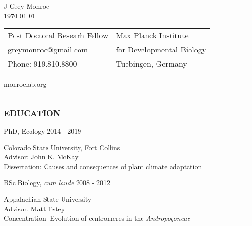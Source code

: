 \documentclass[12pt,english]{article}
\providecommand{\tabularnewline}{\\}
\begin{document}
\begin {center}
{\huge J Grey Monroe}\tabularnewline
\vspace{1em}
\today

\vspace{1em}

\begin{tabular}{>{\raggedright}p{3in}>{\raggedleft}p{3in}}
Post Doctoral Researh Fellow & Max Planck Institute\tabularnewline
 greymonroe@gmail.com &  for Developmental Biology \tabularnewline
Phone: 919.810.8800 & Tuebingen, Germany\tabularnewline
\end{tabular}
\href{https://monroelab.org}{monroelab.org}
\end{center}
\vspace{-1em}

\rule[0.5ex]{1\columnwidth}{0.5pt}


\subsubsection*{EDUCATION}
\vspace{-0.5ex}

\hspace{1.0em} PhD, Ecology
\hfill
2014 - 2019
\par
\hspace*{2.0em} Colorado State University, Fort Collins \\
\hspace*{2.0em} Advisor: John K. McKay \\
\hspace*{2.0em} Dissertation: Causes and consequences of plant climate adaptation
\\
\vspace{-0.5ex}\par

\hspace{1.0em} BSc Biology, \emph{cum laude}
\hfill
2008 - 2012
\par
\hspace*{2.0em} Appalachian State University \\
\hspace*{2.0em} Advisor: Matt Estep \\
\hspace*{2.0em} Concentration: Evolution of centromeres in the \textit{Andropogoneae} \\
\end{document}
